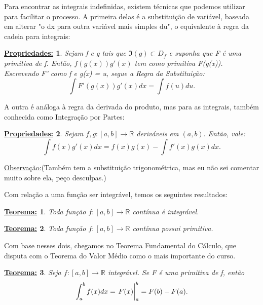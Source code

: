 \documentclass{article}
\newtheorem*{prop*}{\underline{Propriedades:}}
\newtheorem*{thm*}{\underline{Teorema:}}
\begin{document}
    Para encontrar as integrais indefinidas, existem t\'ecnicas que podemos utilizar para facilitar o processo. A primeira delas \'e a substitui\c c\~ao de vari\'avel,
    baseada em alterar "o dx para outra vari\'avel mais simples du", o equivalente \`a regra da cadeia para integrais:
    \begin{prop*}
        Sejam f e g tais que $\Im(g)\subset{D_f}$ e suponha que F \'e uma primitiva de f. Ent\~ao, $f(g(x))g'(x)$ tem como primitiva F(g(x)). Escrevendo F' como f
        e g(x) = u, segue a Regra da Substitui\c c\~ao:
        $$
            \int F'(g(x))g'(x)dx = \int f(u) du.
        $$
    \end{prop*}
    A outra \'e an\'aloga \`a regra da derivada do produto, mas para as integrais, tamb\'em conhecida como Integra\c c\~ao por Partes:
    \begin{prop*}
        Sejam $f, g:[a, b]\rightarrow\mathbb{R}$ deriv\'aveis em $(a, b).$ Ent\~ao, vale:
        $$
            \int f(x)g'(x)dx = f(x)g(x) - \int f'(x)g(x)dx.
        $$
    \end{prop*}
    \underline{Observa\c c\~ao:}(Tamb\'em tem a substitui\c c\~ao trigonom\'etrica, mas eu n\~ao sei comentar muito sobre ela, pe\c co desculpas.)

    Com rela\c c\~ao a uma fun\c c\~ao ser integr\'avel, temos os seguintes resultados:
    \begin{thm*}
        Toda fun\c c\~ao $f:[a, b]\rightarrow\mathbb{R}$ cont\'inua \'e integr\'avel.
    \end{thm*}
    \begin{thm*}
        Toda fun\c c\~ao $f:[a, b]\rightarrow\mathbb{R}$ cont\'inua possui primitiva.
    \end{thm*}
    Com base nesses dois, chegamos no Teorema Fundamental do C\'alculo, que disputa com o Teorema do Valor M\'edio como o mais importante do curso.
    \begin{thm*}
        Seja $f:[a, b]\rightarrow\mathbb{R}$ integr\'avel. Se F \'e uma primitiva de f, ent\~ao
        $$
            \int_{a}^{b} f(x)dx = \eval{F(x)}_{a}^{b} = F(b) - F(a).
        $$
    \end{thm*}
\end{document}
